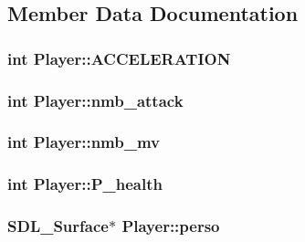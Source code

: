 \subsection{Member Data Documentation}
\subsubsection[{\texorpdfstring{A\+C\+C\+E\+L\+E\+R\+A\+T\+I\+ON}{ACCELERATION}}]{\setlength{\rightskip}{0pt plus 5cm}int Player\+::\+A\+C\+C\+E\+L\+E\+R\+A\+T\+I\+ON}\hypertarget{structPlayer_ac707fbe9ef7f1fbec4f0ead3d131ea27}{}\label{structPlayer_ac707fbe9ef7f1fbec4f0ead3d131ea27}
\subsubsection[{\texorpdfstring{nmb\+\_\+attack}{nmb_attack}}]{\setlength{\rightskip}{0pt plus 5cm}int Player\+::nmb\+\_\+attack}\hypertarget{structPlayer_a46d866a8e46a5bd24c54a07ca1d5661a}{}\label{structPlayer_a46d866a8e46a5bd24c54a07ca1d5661a}
\subsubsection[{\texorpdfstring{nmb\+\_\+mv}{nmb_mv}}]{\setlength{\rightskip}{0pt plus 5cm}int Player\+::nmb\+\_\+mv}\hypertarget{structPlayer_ae1855b9023f45e44bb961c870924e871}{}\label{structPlayer_ae1855b9023f45e44bb961c870924e871}
\subsubsection[{\texorpdfstring{P\+\_\+health}{P_health}}]{\setlength{\rightskip}{0pt plus 5cm}int Player\+::\+P\+\_\+health}\hypertarget{structPlayer_a70687e65c047bdcf53daadc3c06778f7}{}\label{structPlayer_a70687e65c047bdcf53daadc3c06778f7}
\subsubsection[{\texorpdfstring{perso}{perso}}]{\setlength{\rightskip}{0pt plus 5cm}S\+D\+L\+\_\+\+Surface$\ast$ Player\+::perso}\hypertarget{structPlayer_ac75433ddad666299d69a01bfabb2e5e6}{}\label{structPlayer_ac75433ddad666299d69a01bfabb2e5e6}
